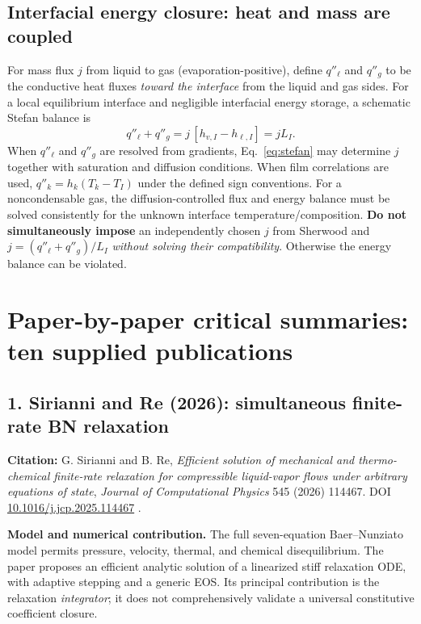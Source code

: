 \documentclass[11pt,letterpaper]{article}
\begin{document}
\subsection{Interfacial energy closure: heat and mass are coupled}
For mass flux $j$ from liquid to gas (evaporation-positive), define $q''_\ell$ and $q''_g$ to be the conductive heat fluxes \emph{toward the interface} from the liquid and gas sides. For a local equilibrium interface and negligible interfacial energy storage, a schematic Stefan balance is
\begin{equation}\label{eq:stefan}
q''_\ell+q''_g=j\,[h_{v,I}-h_{\ell,I}]=j L_I.
\end{equation}
When $q''_\ell$ and $q''_g$ are resolved from gradients, Eq.~\eqref{eq:stefan} may determine $j$ together with saturation and diffusion conditions. When film correlations are used, $q''_k=h_k(T_k-T_I)$ under the defined sign conventions. For a noncondensable gas, the diffusion-controlled flux and energy balance must be solved consistently for the unknown interface temperature/composition. \textbf{Do not simultaneously impose} an independently chosen $j$ from Sherwood and $j=(q''_\ell+q''_g)/L_I$ \emph{without solving their compatibility}. Otherwise the energy balance can be violated.

\section{Paper-by-paper critical summaries: ten supplied publications}
\subsection{1. Sirianni and Re (2026): simultaneous finite-rate BN relaxation}
\textbf{Citation:} G. Sirianni and B. Re, \emph{Efficient solution of mechanical and thermo-chemical finite-rate relaxation for compressible liquid-vapor flows under arbitrary equations of state}, \emph{Journal of Computational Physics} 545 (2026) 114467. DOI \href{https://doi.org/10.1016/j.jcp.2025.114467}{10.1016/j.jcp.2025.114467} \cite{SirianniRe2026}.

\textbf{Model and numerical contribution.} The full seven-equation Baer--Nunziato model permits pressure, velocity, thermal, and chemical disequilibrium. The paper proposes an efficient analytic solution of a linearized stiff relaxation ODE, with adaptive stepping and a generic EOS. Its principal contribution is the relaxation \emph{integrator}; it does not comprehensively validate a universal constitutive coefficient closure.
\end{document}
